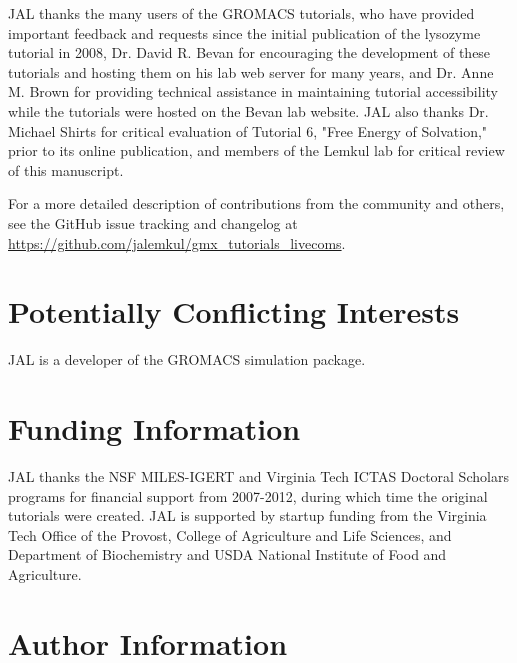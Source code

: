 \documentclass[9pt,tutorial,pubversion]{livecoms}
\newcommand{\githubrepository}{\url{https://github.com/jalemkul/gmx_tutorials_livecoms}}  %
\begin{document}
JAL thanks the many users of the GROMACS tutorials, who have provided important feedback and requests since the initial publication of the lysozyme tutorial in 2008, Dr. David R. Bevan for encouraging the development of these tutorials and hosting them on his lab web server for many years, and Dr. Anne M. Brown for providing technical assistance in maintaining tutorial accessibility while the tutorials were hosted on the Bevan lab website. JAL also thanks Dr. Michael Shirts for critical evaluation of Tutorial 6, "Free Energy of Solvation," prior to its online publication, and members of the Lemkul lab for critical review of this manuscript.

For a more detailed description of contributions from the community and others, see the GitHub issue tracking and changelog at \githubrepository.

\section{Potentially Conflicting Interests}

JAL is a developer of the GROMACS simulation package.

\section{Funding Information}
JAL thanks the NSF MILES-IGERT and Virginia Tech ICTAS Doctoral Scholars programs for financial support from 2007-2012, during which time the original tutorials were created. JAL is supported by startup funding from the Virginia Tech Office of the Provost, College of Agriculture and Life Sciences, and Department of Biochemistry and USDA National Institute of Food and Agriculture.

\section*{Author Information}
\makeorcid




\end{document}
